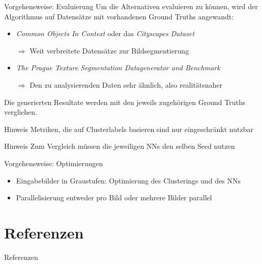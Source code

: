 \documentclass[9pt]{beamer}
\begin{document}
\begin{frame}{Vorgehensweise: Evaluierung}
Um die Alternativen evaluieren zu können, wird der Algorithmus auf Datensätze mit vorhandenen Ground Truths angewandt:
\medskip
\begin{itemize}
	\item \textit{Common Objects In Context}\cite{LMBHPRDZ:ECCV:2014} oder das \textit{Cityscapes Dataset}\cite{Cordts2016Cityscapes}
	\item[$\Rightarrow$] Weit verbreitete Datensätze zur Bildsegmentierung
	\medskip
	\item \textit{The Prague Texture Segmentation Datagenerator and Benchmark}\cite{mikevs2015benchmarking}
	\item[$\Rightarrow$] Den zu analysierenden Daten sehr ähnlich, also realitätsnaher
\end{itemize}

Die generierten Resultate werden mit den jeweils zugehörigen Ground Truths verglichen.
\pause
\begin{block}{Hinweis}
	Metriken, die auf Clusterlabels basieren sind nur eingeschränkt nutzbar
\end{block}
\pause
\begin{block}{Hinweis}
	Zum Vergleich müssen die jeweiligen NNs den selben Seed nutzen
\end{block}
\end{frame}

\begin{frame}{Vorgehensweise: Optimierungen}
	\begin{itemize}
		\item Eingabebilder in Graustufen: Optimierung des Clusterings und des NNs
		\item Parallelisierung entweder pro Bild oder mehrere Bilder parallel
	\end{itemize}
\end{frame}

\section{Referenzen}

\begin{frame}[shrink=25]{Referenzen}
	
	
\end{frame}

	
\end{document}
